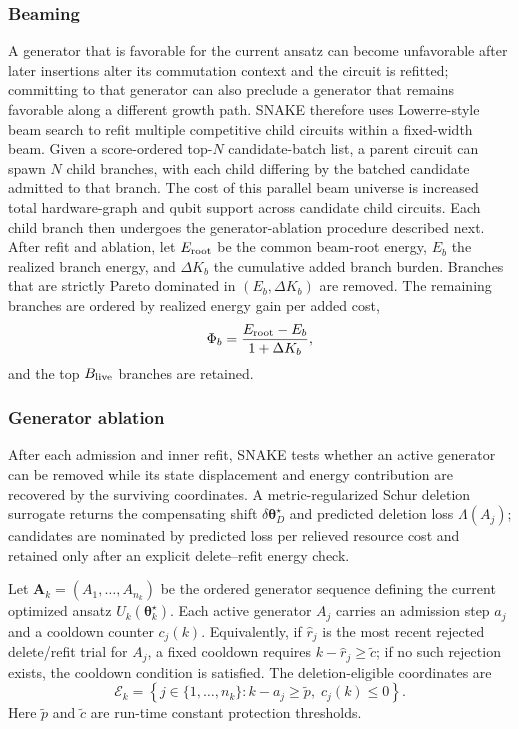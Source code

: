 \documentclass[
  reprint,
  amsmath,
  amssymb,
  aps,
  pra,
  nofootinbib,
  superscriptaddress,
  floatfix
]{revtex4-2}
\begin{document}
\subsubsection{Beaming}
A generator that is favorable for the current ansatz can become unfavorable
after later insertions alter its commutation context and the circuit is
refitted; committing to that generator can also preclude a generator that
remains favorable along a different growth path. \textsc{SNAKE} therefore uses
Lowerre-style beam search \cite{Lowerre1976Beam} to refit multiple competitive
child circuits within a fixed-width beam. Given a score-ordered top-$N$
candidate-batch list, a parent circuit can spawn $N$ child branches, with each
child differing by the batched candidate admitted to that branch. The cost of
this parallel beam universe is increased total hardware-graph and qubit support
across candidate child circuits. Each child branch then undergoes the
generator-ablation procedure described next. After refit and ablation, let
\(E_{\rm root}\) be the common beam-root energy, \(E_b\) the realized branch
energy, and \(\Delta K_b\) the cumulative added branch burden. Branches that are
strictly Pareto dominated in \((E_b,\Delta K_b)\) are removed. The remaining
branches are ordered by realized energy gain per added cost,
\begin{equation*}
\Phi_b=\frac{E_{\rm root}-E_b}{1+\Delta K_b},
\end{equation*}
and the top \(B_{\rm live}\) branches are retained.


\subsubsection{Generator ablation}
%
After each admission and inner refit, \textsc{SNAKE} tests whether an active
generator can be removed while its state displacement and energy contribution
are recovered by the surviving coordinates. A metric-regularized Schur
deletion surrogate returns the compensating shift
\(\delta\boldsymbol\theta_D^\star\) and predicted deletion loss
\(\Lambda(A_j)\); candidates are nominated by predicted loss per relieved
resource cost and retained only after an explicit delete--refit energy check.

Let \(\mathbf A_k=(A_1,\ldots,A_{n_k})\) be the ordered generator sequence
defining the current optimized ansatz \(U_k(\boldsymbol\theta_k^\star)\).
Each active generator \(A_j\) carries an admission step \(a_j\) and a cooldown
counter \(c_j(k)\). Equivalently, if \(\hat r_j\) is the most recent rejected
delete/refit trial for \(A_j\), a fixed cooldown requires
\(k-\hat r_j\ge\tilde c\); if no such rejection exists, the cooldown condition
is satisfied. The deletion-eligible coordinates are
\begin{equation*}
\mathcal E_k
=
\left\{
j\in\{1,\ldots,n_k\}
:
k-a_j\ge \tilde p,\;
c_j(k)\le0
\right\}.
\end{equation*}
Here \(\tilde p\) and \(\tilde c\) are run-time constant protection thresholds.
\end{document}
